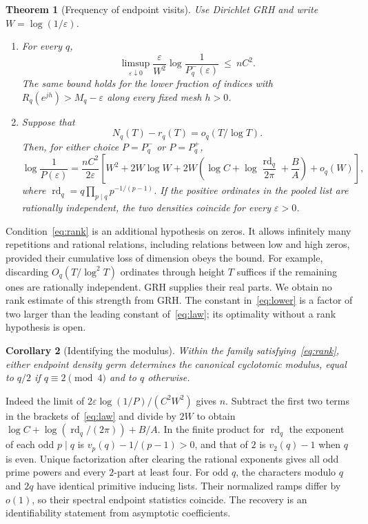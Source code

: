 \documentclass[11pt]{article}
\newtheorem{theorem}{Theorem}\newtheorem{lemma}[theorem]{Lemma}\newtheorem{corollary}[theorem]{Corollary}
\newcommand{\eps}{\varepsilon}\newcommand{\rd}{\operatorname{rd}}\newcommand{\EE}{\mathbb E}\newcommand{\PP}{\mathbb P}
\begin{document}
\begin{theorem}[Frequency of endpoint visits]\label{thm:main}
Use Dirichlet GRH and write $W=\log(1/\eps)$.
\begin{enumerate}
\item For every $q$,
\begin{equation}\label{eq:lower}
 \limsup_{\eps\downarrow0}\frac{\eps}{W^2}\log\frac1{P_q^-(\eps)}
 \ \le\ n C^2 .
\end{equation}
The same bound holds for the lower fraction of indices with $R_q(e^{jh})>M_q-\eps$ along every fixed mesh $h>0$.
\item Suppose that
\begin{equation}\label{eq:rank}
 N_q(T)-r_q(T)=o_q(T/\log T).
\end{equation}
Then, for either choice $P=P_q^-$ or $P=P_q^+$,
\begin{equation}\label{eq:law}
 \log\frac1{P(\eps)}=
 \frac{n C^2}{2\eps}\left[W^2+2W\log W+
 2W\left(\log C+\log\frac{\rd_q}{2\pi}+\frac BA\right)+o_q(W)\right],
\end{equation}
where $\rd_q=q\prod_{p\mid q}p^{-1/(p-1)}$. If the positive ordinates in the pooled list are rationally independent, the two densities coincide for every $\eps>0$.
\end{enumerate}
\end{theorem}
Condition~\eqref{eq:rank} is an additional hypothesis on zeros. It allows infinitely many repetitions and rational relations, including relations between low and high zeros, provided their cumulative loss of dimension obeys the bound. For example, discarding $O_q(T/\log^2 T)$ ordinates through height $T$ suffices if the remaining ones are rationally independent. GRH supplies their real parts. We obtain no rank estimate of this strength from GRH. The constant in~\eqref{eq:lower} is a factor of two larger than the leading constant of~\eqref{eq:law}; its optimality without a rank hypothesis is open.

\begin{corollary}[Identifying the modulus]\label{cor:conductor}
Within the family satisfying~\eqref{eq:rank}, either endpoint density germ determines the canonical cyclotomic modulus, equal to $q/2$ if $q\equiv2\pmod4$ and to $q$ otherwise.
\end{corollary}
Indeed the limit of $2\eps\log(1/P)/(C^2W^2)$ gives $n$. Subtract the first two terms in the brackets of~\eqref{eq:law} and divide by $2W$ to obtain $\log C+\log(\rd_q/(2\pi))+B/A$. In the finite product for $\rd_q$ the exponent of each odd $p\mid q$ is $v_p(q)-1/(p-1)>0$, and that of $2$ is $v_2(q)-1$ when $q$ is even. Unique factorization after clearing the rational exponents gives all odd prime powers and every $2$-part at least four. For odd $q$, the characters modulo $q$ and $2q$ have identical primitive inducing lists. Their normalized ramps differ by $o(1)$, so their spectral endpoint statistics coincide. The recovery is an identifiability statement from asymptotic coefficients.
\end{document}
